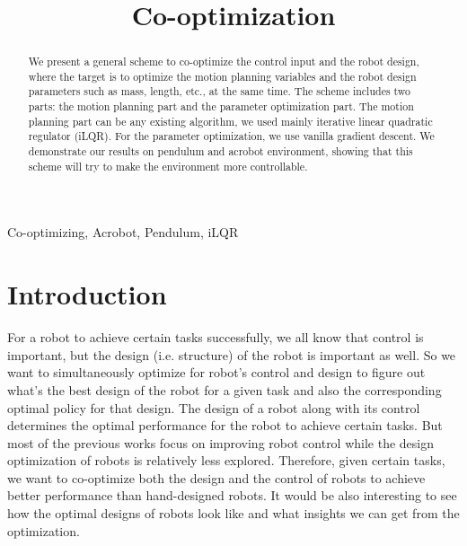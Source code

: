 \documentclass[conference]{IEEEtran}
\begin{document}
\title{Co-optimization\\
}

\author{
\and
{}
}

\maketitle

\begin{abstract}
We present a general scheme to co-optimize the control input and the robot design, where the target is to optimize the motion planning variables and the robot design parameters such as mass, length, etc., at the same time. The scheme includes two parts: the motion planning part and the parameter optimization part. The motion planning part can be any existing algorithm, we used mainly iterative linear quadratic regulator (iLQR). For the parameter optimization, we use vanilla gradient descent. We demonstrate our results on pendulum and acrobot environment, showing that this scheme will try to make the environment more controllable. 
\end{abstract}

\begin{IEEEkeywords}
Co-optimizing, Acrobot, Pendulum, iLQR
\end{IEEEkeywords}


\section{Introduction}

For a robot to achieve certain tasks successfully, we all know that control is important, but the design (i.e. structure) of the robot is important as well. So we want to simultaneously optimize for robot's control and design to figure out what's the best design of the robot for a given task and also the corresponding optimal policy for that design. The design of a robot along with its control determines the optimal performance for the robot to achieve certain tasks. But most of the previous works focus on improving robot control while the design optimization of robots is relatively less explored. Therefore, given certain tasks, we want to co-optimize both the design and the control of robots to achieve better performance than hand-designed robots. It would be also interesting to see how the optimal designs of robots look like and what insights we can get from the optimization.
\end{document}
